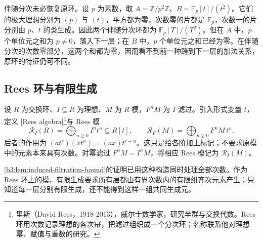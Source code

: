 伴随分次未必恢复原环。设 \(p\) 为素数，取 \(A=\mathbb Z/p^2\mathbb Z\)、\(B=\mathbb F_p[t]/(t^2)\)。它们的极大理想分别为 \((p)\) 与 \((t)\)，平方都为零，次数零的片都是 \(\mathbb F_p\)，次数一的片分别由 \(p\)、\(t\) 的类生成。因此两个伴随分次环都为 \(\mathbb F_p[T]/(T^2)\)。但在 \(A\) 中，\(p\) 个单位元之和为 \(p\ne0\)，落入下一层；在 \(B\) 中，\(p\) 个单位元之和已经为零。在伴随分次的次数零部分，这两个和都为零，因而看不到前一种跨到下一层的加法关系，原环的特征仍可不同。

\subsection{Rees 环与有限生成}
\label{b3:subsec:1301:03}

\begin{definition}\label{b3:def:rees-algebra-module}
	设 \(R\) 为交换环、\(I\subseteq R\) 为理想、\(M\) 为 \(R\) 模，\(F^nM\) 为 \(I\) 滤过。引入形式变量 \(t\)，定义 [Rees algebra]\footnote{里斯（David Rees，1918-2013），威尔士数学家，研究半群与交换代数。Rees 环用次数记录理想的各次幂，把滤过组织成一个分次环；名称联系他对理想幂、赋值与重数的研究。}与 Rees 模
	\[
		\mathcal R_I(R)=\bigoplus_{n\ge0}I^nt^n\subseteq R[t],\qquad \mathcal R_F(M)=\bigoplus_{n\ge0}F^nM\,t^n.
	\]
	后者的作用为 \((at^r)(xt^n)=(ax)t^{r+n}\)。这只是给各阶加上标记；不要求原模中的元素本来具有次数。对幂滤过 \(F^nM=I^nM\)，将相应 Rees 模记为 \(\mathcal R_I(M)\)。
\end{definition}

\cref{b3:lem:induced-filtration-bound}的证明已用这种构造同时处理全部次数。作为 Rees 环上的模，有限生成要求所有层都由有界次数内的有限组齐次元素产生；只知道每一层分别有限生成，还不能得到这样一组共同生成元。

